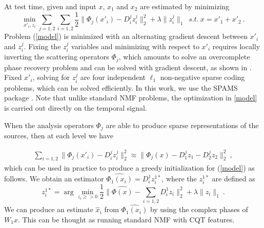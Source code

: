 At test time, given and input $x$, $x_1$ and $x_2$ are estimated by minimizing
\begin{equation}
\label{model}
\min_{x'_i, z_i}  \sum_{j=1,2} \sum_{i=1,2} \frac{1}{2} \| \Phi_j(x'_i) - D^j_i z^j_i \|_2^2 + \lambda \| z^j_i \|_1 \,\,\,s.t. ~x=x'_1 + x'_2~.
\end{equation}
Problem (\ref{model}) is minimized with an alternating gradient descent between $x'_i$ and  $z^j_i$. 
Fixing the $z^j_i$ variables and minimizing with respect to $x'_i$ requires locally inverting the scattering 
operators $\Phi_j$, which amounts to solve an overcomplete phase recovery problem and 
can be solved with gradient descent, as shown in \cite{bruna2013audio}. 
Fixed $x'_i$, solving for $z^j_i$ are four independent $\ell_1$ non-negative sparse coding problems, which can be solved 
efficiently. In this work, we use the SPAMS package \cite{mairal2009online}. 
% 
Note that unlike standard NMF problems, the optimization in \ref{model} is carried out directly on the temporal signal.

When the analysis operators $\Phi_j$ are able to produce sparse representations of the sources, 
then at each level we have

\begin{eqnarray}
\sum_{i=1,2}  \| \Phi_j(x'_i) - D^j_i z^j_i \|_2^2 \approx \| \Phi_j(x) - D^j_1 z_1 - D^j_2 z_2 \|_2^2 ~,
\end{eqnarray}
which can be used in practice to produce a greedy initialization for (\ref{model}) as follows. 
We obtain an estimator $\widehat{\Phi_1(x_i)}= D^1_i z^{1*}_i$, where the $z^{1*}_i$ are defined as 
$$z^{1*}_i = \arg\min_{z_i \geq>0} \frac{1}{2}\| \widehat{\Phi(x)} - \sum_{i=1,2} D^1_i z_i \|_2^2 +\lambda \| z_i \|_1~.$$
We can produce an estimate $\widehat{x}_i$ from  $\widehat{\Phi_1(x_i)}$ by using the complex phases of $W_1 x$.
This can be thought as running standard NMF with CQT features.

